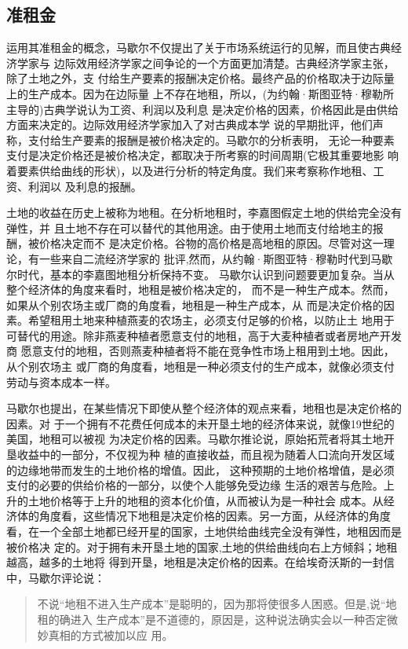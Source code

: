 \subsection{准租金}

运用其准租金的概念，马歇尔不仅提出了关于市场系统运行的见解，而且使古典经济学家与
边际效用经济学家之间争论的一个方面更加清楚。古典经济学家主张，除了土地之外，支
付给生产要素的报酬决定价格。最终产品的价格取决于边际量上的生产成本。因为在边际量
上不存在地租，所以，(为约翰·斯图亚特·穆勒所主导的)古典学说认为工资、利润以及利息
是决定价格的因素，价格因此是由供给方面来决定的。边际效用经济学家加入了对古典成本学
说的早期批评，他们声称，支付给生产要素的报酬是被价格决定的。马歇尔的分析表明，
无论一种要素支付是决定价格还是被价格决定，都取决于所考察的时间周期(它极其重要地影
响着要素供给曲线的形状)，以及进行分析的特定角度。我们来考察称作地租、工资、利润以
及利息的报酬。

土地的收益在历史上被称为地租。在分析地租时，李嘉图假定土地的供给完全没有弹性，并
且土地不存在可以替代的其他用途。由于使用土地而支付给地主的报酬，被价格决定而不
是决定价格。谷物的高价格是高地租的原因。尽管对这一理论，有一些来自二流经济学家的
批评,然而，从约翰·斯图亚特·穆勒时代到马歇尔时代，基本的李嘉图地租分析保持不变。
马歇尔认识到问题要更加复杂。当从整个经济体的角度来看时，地租是被价格决定的，
而不是一种生产成本。然而，如果从个别农场主或厂商的角度看，地租是一种生产成本，从
而是决定价格的因素。希望租用土地来种植燕麦的农场主，必须支付足够的价格，以防止土
地用于可替代的用途。除非燕麦种植者愿意支付的地租，高于大麦种植者或者房地产开发商
愿意支付的地租，否则燕麦种植者将不能在竞争性市场上租用到土地。因此，从个别农场主
或厂商的角度看，地租是一种必须支付的生产成本，就像必须支付劳动与资本成本一样。

马歇尔也提出，在某些情况下即使从整个经济体的观点来看，地租也是决定价格的因素。对
于一个拥有不花费任何成本的未开垦土地的经济体来说，就像19世纪的美国，地租可以被视
为决定价格的因素。马歇尔推论说，原始拓荒者将其土地开垦收益中的一部分，不仅视为种
植的直接收益，而且视为随着人口流向开发区域的边缘地带而发生的土地价格的增值。因此，
这种预期的土地价格增值，是必须支付的必要的供给价格的一部分，以使个人能够免受边缘
生活的艰苦与危险。上升的土地价格等于上升的地租的资本化价值，从而被认为是一种社会
成本。从经济体的角度看，这些情况下地租是决定价格的因素。另一方面，从经济体的角度
看，在一个全部土地都已经开星的国家，土地供给曲线完全没有弹性，地租因而是被价格决
定的。对于拥有未开垦土地的国家,土地的供给曲线向右上方倾斜；地租越高，越多的土地将
得到开垦，地租是决定价格的因素。在给埃奇沃斯的一封信中，马歇尔评论说：
\begin{quotation}
  不说“地租不进入生产成本”是聪明的，因为那将使很多人困惑。但是,说“地租的确进入
  生产成本”是不道德的，原因是，这种说法确实会以一种否定微妙真相的方式被加以应
  用。
\end{quotation}

